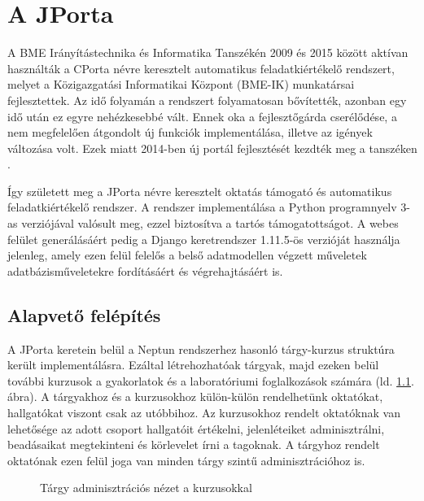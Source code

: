\chapter{A JPorta}\label{chapter:jporta}

A BME Irányítástechnika és Informatika Tanszékén 2009 és 2015 között aktívan használták a CPorta névre keresztelt automatikus feladatkiértékelő rendszert, melyet a Közigazgatási Informatikai Központ (BME-IK) munkatársai fejlesztettek. Az idő folyamán a rendszert folyamatosan bővítették, azonban egy idő után ez egyre nehézkesebbé vált. Ennek oka a fejlesztőgárda cserélődése, a nem megfelelően átgondolt új funkciók implementálása, illetve az igények változása volt. Ezek miatt 2014-ben új portál fejlesztését kezdték meg a tanszéken \cite{KalmanMsc}.

 Így született meg a JPorta névre keresztelt oktatás támogató és automatikus feladatkiértékelő rendszer. A rendszer implementálása a Python programnyelv 3-as verziójával valósult meg, ezzel biztosítva a tartós támogatottságot. A webes felület generálásáért pedig a Django \cite{Django} keretrendszer 1.11.5-ös verzióját használja jelenleg, amely ezen felül felelős a belső adatmodellen végzett műveletek adatbázisműveletekre fordításáért és végrehajtásáért is. 

 \section{Alapvető felépítés}

    A JPorta keretein belül a Neptun rendszerhez hasonló tárgy-kurzus struktúra került implementálásra. Ezáltal létrehozhatóak tárgyak, majd ezeken belül további kurzusok a gyakorlatok és a laboratóriumi foglalkozások számára (ld. \ref{fig:jporta_course}. ábra). A tárgyakhoz és a kurzusokhoz külön-külön rendelhetünk oktatókat, hallgatókat viszont csak az utóbbihoz. Az kurzusokhoz rendelt oktatóknak van lehetősége az adott csoport hallgatóit értékelni, jelenléteiket adminisztrálni, beadásaikat megtekinteni és körlevelet írni a tagoknak. A tárgyhoz rendelt oktatónak ezen felül joga van minden tárgy szintű adminisztrációhoz is.

     \begin{figure}[h]
        \centering
        \caption{Tárgy adminisztrációs nézet a kurzusokkal}
        \label{fig:jporta_course}
    \end{figure}    

